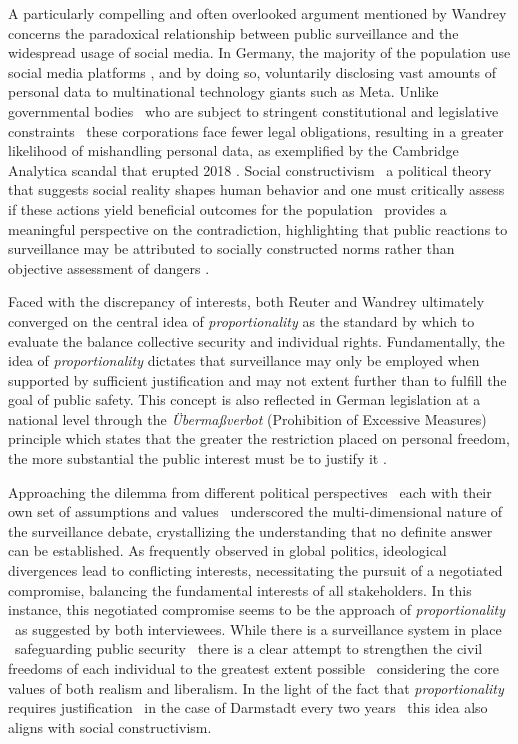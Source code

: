 \documentclass[12pt]{article}
\begin{document}
	A particularly compelling and often overlooked argument mentioned by Wandrey concerns the paradoxical relationship between public surveillance and the widespread usage of social media. In Germany, the majority of the population use social media platforms \parencite{koptyug2025, worldometer_germany2025}, and by doing so, voluntarily disclosing vast amounts of personal data to multinational technology giants such as Meta. Unlike governmental bodies \textemdash\ who are subject to stringent constitutional and legislative constraints \textemdash\ these corporations face fewer legal obligations, resulting in a greater likelihood of mishandling personal data, as exemplified by the Cambridge Analytica scandal that erupted 2018 \parencite{harbath_cambridge_2023}. Social constructivism \textemdash\ a political theory that suggests social reality shapes human behavior and one must critically assess if these actions yield beneficial outcomes for the population \textemdash\ provides a meaningful perspective on the contradiction, highlighting that public reactions to surveillance may be attributed to socially constructed norms rather than objective assessment of dangers \parencite{courseCompanion2024}. 
	
	Faced with the discrepancy of interests, both Reuter and Wandrey ultimately converged on the central idea of \textit{proportionality} as the standard by which to evaluate the balance collective security and individual rights. Fundamentally, the idea of \textit{proportionality} dictates that surveillance may only be employed when supported by sufficient justification and may not extent further than to fulfill the goal of public safety. This concept is also reflected in German legislation at a national level through the \textit{Übermaßverbot} (Prohibition of Excessive Measures) principle which states that the greater the restriction placed on personal freedom, the more substantial the public interest must be to justify it \parencite{wetzling2023}.
	
	Approaching the dilemma from different political perspectives \textemdash\ each with their own set of assumptions and values \textemdash\ underscored the multi-dimensional nature of the surveillance debate, crystallizing the understanding that no definite answer can be established. As frequently observed in global politics, ideological divergences lead to conflicting interests, necessitating the pursuit of a negotiated compromise, balancing the fundamental interests of all stakeholders. In this instance, this negotiated compromise seems to be the approach of \textit{proportionality} \textemdash\ as suggested by both interviewees. While there is a surveillance system in place \textemdash\ safeguarding public security \textemdash\ there is a clear attempt to strengthen the civil freedoms of each individual to the greatest extent possible \textemdash\ considering the core values of both realism and liberalism. In the light of the fact that \textit{proportionality} requires justification \textemdash\ in the case of Darmstadt every two years \textemdash\ this idea also aligns with social constructivism. 
	
\end{document}
